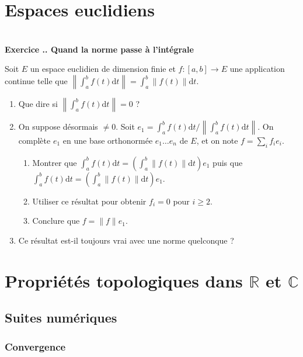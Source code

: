 \documentclass{article}
\newcommand{\di}{\mathrm{d}}
\newcommand{\mb}[1]{\mathbb{#1}}
\newcounter{exo}
\newcommand{\exercice}[1][\null]{\textbf{\\ Exercice \thesection.\theexo. #1} \addtocounter{exo}{1}}
\begin{document}
\section{Espaces euclidiens}

\exercice[Quand la norme passe à l'intégrale]

Soit $E$ un espace euclidien de dimension finie et $f : [a,b] \rightarrow E$ une application continue telle que $\displaystyle \left\lVert\int_a^b f(t) \di t \right\lVert = \int_a^b \lVert f(t)\lVert \di t$.

\begin{enumerate}

\item Que dire si $\left\lVert\int_a^b f(t) \di t \right\lVert = 0$ ?

\item On suppose désormais $\neq 0$. Soit $e_1 = \int_a^b f(t) \di t \Big/  \left\lVert\int_a^b f(t) \di t \right\lVert $. On complète $e_1$ en une base orthonormée $e_1 \dots e_n$ de $E$, et on note $f = \sum_i f_i e_i$.
\begin{enumerate}

\item Montrer que $\int_a^b f(t) \di t = (\int_a^b \lVert f(t) \rVert \di t) e_1$ puis que $\int_a^b f(t) \di t = (\int_a^b \lVert f(t) \rVert \di t) e_1$.

\item Utiliser ce résultat pour obtenir $f_i = 0$ pour $i \ge 2$.

\item Conclure que $f = \lVert f \lVert e_1$.

\end{enumerate}

\item Ce résultat est-il toujours vrai avec une norme quelconque ?

\end{enumerate}

\section{Propriétés topologiques dans $\mb{R}$ et $\mb{C}$}

\subsection{Suites numériques}

\subsubsection{Convergence}
\end{document}

